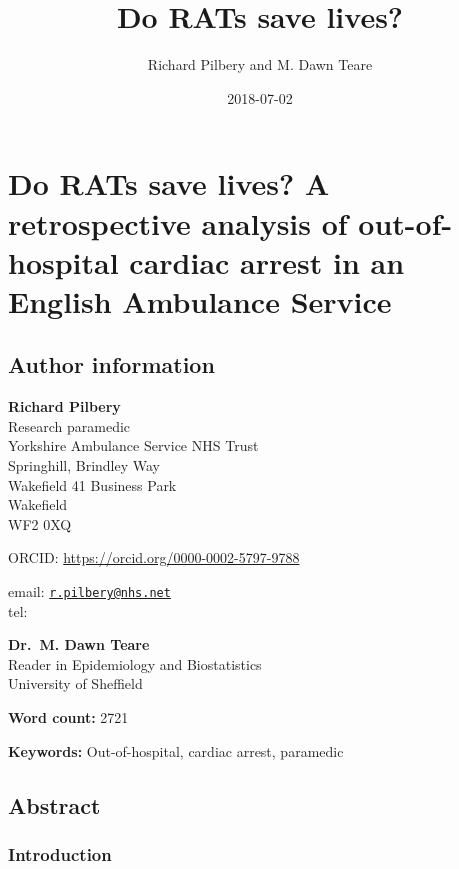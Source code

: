\documentclass[]{article}
\title{Do RATs save lives?}
\author{Richard Pilbery and M. Dawn Teare}
\date{2018-07-02}
\theoremstyle{definition}
\theoremstyle{definition}
\theoremstyle{definition}
\theoremstyle{remark}
\begin{document}
\maketitle

\hypertarget{do-rats-save-lives-a-retrospective-analysis-of-out-of-hospital-cardiac-arrest-in-an-english-ambulance-service}{%
\section{Do RATs save lives? A retrospective analysis of out-of-hospital
cardiac arrest in an English Ambulance
Service}\label{do-rats-save-lives-a-retrospective-analysis-of-out-of-hospital-cardiac-arrest-in-an-english-ambulance-service}}

\hypertarget{author-information}{%
\subsection{Author information}\label{author-information}}

\textbf{Richard Pilbery}\\
Research paramedic\\
Yorkshire Ambulance Service NHS Trust\\
Springhill, Brindley Way\\
Wakefield 41 Business Park\\
Wakefield\\
WF2 0XQ

ORCID: \url{https://orcid.org/0000-0002-5797-9788}

email: \href{mailto:r.pilbery@nhs.net}{\nolinkurl{r.pilbery@nhs.net}}\\
tel:

\textbf{Dr.~M. Dawn Teare}\\
Reader in Epidemiology and Biostatistics\\
University of Sheffield

\textbf{Word count:} 2721

\textbf{Keywords:} Out-of-hospital, cardiac arrest, paramedic

\hypertarget{abstract}{%
\subsection{Abstract}\label{abstract}}

\hypertarget{introduction}{%
\subsubsection{Introduction}\label{introduction}}
\end{document}
